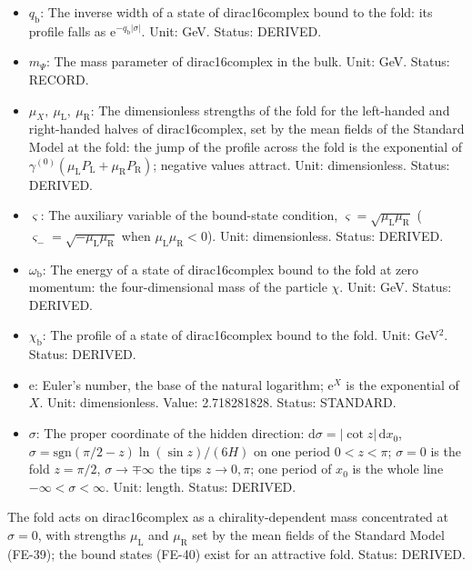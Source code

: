 \documentclass[
  10pt,
]{article}
\providecommand{\tightlist}{%
  \setlength{\itemsep}{0pt}\setlength{\parskip}{0pt}}
\begin{document}
\begin{itemize}
\tightlist
\item
  \(q_{\mathrm{b}}\): The inverse width of a state of dirac16complex
  bound to the fold: its profile falls as
  \(\mathrm{e}^{-q_{\mathrm{b}}\lvert\sigma\rvert}\). Unit: GeV. Status:
  DERIVED.
\item
  \(m_\Psi\): The mass parameter of dirac16complex in the bulk. Unit:
  GeV. Status: RECORD.
\item
  \(\mu_X,\ \mu_{\mathrm{L}},\ \mu_{\mathrm{R}}\): The dimensionless
  strengths of the fold for the left-handed and right-handed halves of
  dirac16complex, set by the mean fields of the Standard Model at the
  fold: the jump of the profile across the fold is the exponential of
  \(\gamma^{(0)}(\mu_{\mathrm{L}}P_{\mathrm{L}} + \mu_{\mathrm{R}}P_{\mathrm{R}})\);
  negative values attract. Unit: dimensionless. Status: DERIVED.
\item
  \(\varsigma\): The auxiliary variable of the bound-state condition,
  \(\varsigma = \sqrt{\mu_{\mathrm{L}}\mu_{\mathrm{R}}}\)
  (\(\varsigma_- = \sqrt{-\mu_{\mathrm{L}}\mu_{\mathrm{R}}}\) when
  \(\mu_{\mathrm{L}}\mu_{\mathrm{R}} < 0\)). Unit: dimensionless.
  Status: DERIVED.
\item
  \(\omega_{\mathrm{b}}\): The energy of a state of dirac16complex bound
  to the fold at zero momentum: the four-dimensional mass of the
  particle \(\chi\). Unit: GeV. Status: DERIVED.
\item
  \(\chi_{\mathrm{b}}\): The profile of a state of dirac16complex bound
  to the fold. Unit: GeV\(^{2}\). Status: DERIVED.
\item
  \(\mathrm{e}\): Euler's number, the base of the natural logarithm;
  \(\mathrm{e}^{X}\) is the exponential of \(X\). Unit: dimensionless.
  Value: 2.718281828. Status: STANDARD.
\item
  \(\sigma\): The proper coordinate of the hidden direction:
  \(\mathrm{d}\sigma = \lvert\cot z\rvert\,\mathrm{d}x_0\),
  \(\sigma = \mathrm{sgn}(\pi/2 - z)\ln(\sin z)/(6H)\) on one period
  \(0 < z < \pi\); \(\sigma = 0\) is the fold \(z = \pi/2\),
  \(\sigma \to \mp\infty\) the tips \(z \to 0, \pi\); one period of
  \(x_0\) is the whole line \(-\infty < \sigma < \infty\). Unit: length.
  Status: DERIVED.
\end{itemize}

The fold acts on dirac16complex as a chirality-dependent mass
concentrated at \(\sigma = 0\), with strengths \(\mu_{\mathrm{L}}\) and
\(\mu_{\mathrm{R}}\) set by the mean fields of the Standard Model
(FE-39); the bound states (FE-40) exist for an attractive fold. Status:
DERIVED.
\end{document}
